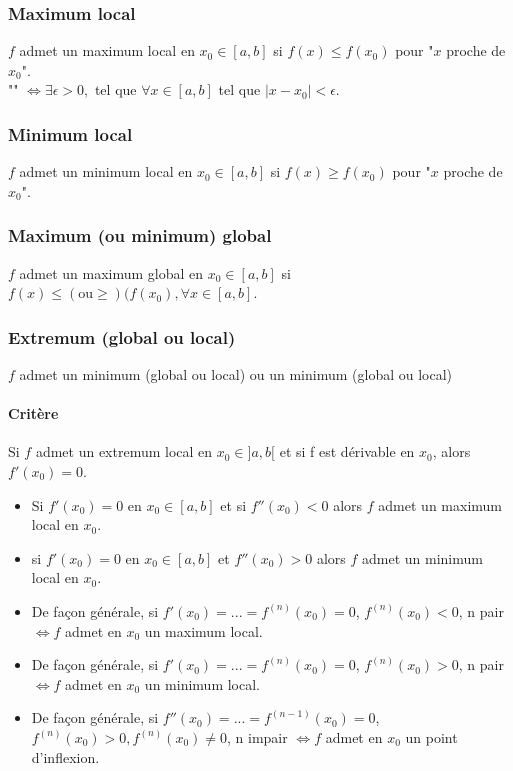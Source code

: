 \documentclass{article}
\begin{document}
\subsubsection{Maximum local}

$ f $ admet un maximum local en $ x_0 \in [a, b] $ si $ f(x) \leq f(x_0) $ pour "$ x $ proche de $ x_0 $". \\
"" $ \Leftrightarrow  \exists \epsilon > 0, $ tel que $ \forall x \in [a,b] $ tel que $ |x-x_0| < \epsilon $.

\subsubsection{Minimum local}

$ f $ admet un minimum local en $ x_0 \in [a, b] $ si $ f(x) \geq f(x_0) $ pour "$ x $ proche de $ x_0 $". \\

\subsubsection{Maximum (ou minimum) global}

$ f $ admet un maximum global en $ x_0 \in [a, b] $ si $ f(x) \leq (\text{ou} \geq) ( f(x_0), \forall x \in [a,b]$.

\subsubsection{Extremum (global ou local)}

$ f $ admet un minimum (global ou local) ou un minimum (global ou local)

\paragraph{Critère} Si $ f $ admet un extremum local en $ x_0 \in ]a, b[$ et si f est dérivable en $ x_0$, alors $ f'(x_0) = 0$.

\begin{itemize}
    \item Si $f'(x_0) = 0$ en $ x_0 \in [a, b]$ et si $ f''(x_0) < 0 $ alors $ f $ admet un maximum local en $ x_0 $.
    \item si $f'(x_0) = 0$ en $ x_0 \in [a, b]$ et $ f''(x_0) > 0$ alors $ f $ admet un minimum local en $ x_0 $.

    \item De façon générale, si $ f'(x_0) = ... = f^{(n)}(x_0) = 0 $, $ f^(n)(x_0) < 0$, n pair $ \Leftrightarrow f $ admet en $ x_0 $ un maximum local.\\
    \item De façon générale, si $ f'(x_0) = ... = f^{(n)}(x_0) = 0 $, $ f^(n)(x_0) > 0$, n pair $ \Leftrightarrow f $ admet en $ x_0 $ un minimum local.\\
    \item De façon générale, si $ f''(x_0) = ... = f^{(n-1)}(x_0) = 0 $, $ f^{(n)}(x_0) > 0, f^{(n)}(x_0) \neq 0$, n impair $ \Leftrightarrow f $ admet en $ x_0 $ un point d'inflexion.\\
\end{itemize}
\end{document}
